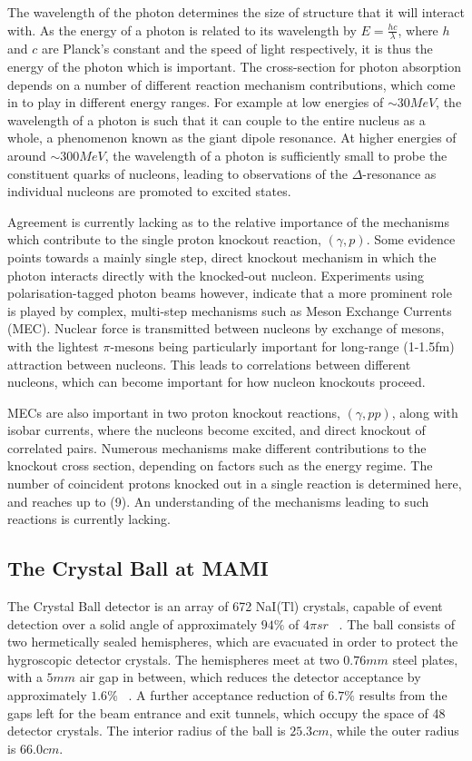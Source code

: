 \documentclass[a4paper,12pt]{article}
\begin{document}
The wavelength of the photon determines the size of structure that it will interact with. As the energy of a photon is related to its wavelength by $E=\frac{hc}{\lambda}$, where $h$ and $c$ are Planck's constant and the speed of light respectively, it is thus the energy of the photon which is important. The cross-section for photon absorption depends on a number of different reaction mechanism contributions, which come in to play in different energy ranges. For example at low energies of $\sim30MeV$, the wavelength of a photon is such that it can couple to the entire nucleus as a whole, a phenomenon known as the giant dipole resonance. At higher energies of around $\sim300MeV$, the wavelength of a photon is sufficiently small to probe the constituent quarks of nucleons, leading to observations of the $\Delta$-resonance as individual nucleons are promoted to excited states.

Agreement is currently lacking as to the relative importance of the mechanisms which contribute to the single proton knockout reaction, $(\gamma,p)$\cite{meucci}{}. Some evidence points towards a mainly single step, direct knockout mechanism in which the photon interacts directly with the knocked-out nucleon\cite{boffi}{}. Experiments using polarisation-tagged photon beams however, indicate that a more prominent role is played by complex, multi-step mechanisms such as Meson Exchange Currents (MEC)\cite{bobeldijk}{}. Nuclear force is transmitted between nucleons by exchange of mesons, with the lightest $\pi$-mesons being particularly important for long-range (1-1.5fm) attraction between nucleons.
This leads to correlations between different nucleons, which can become important for how nucleon knockouts proceed.

MECs are also important in two proton knockout reactions, $(\gamma,pp)$, along with isobar currents, where the nucleons become excited, and direct knockout of correlated pairs. Numerous mechanisms make different contributions to the knockout cross section, depending on factors such as the energy regime\cite{robinson}{}. The number of coincident protons knocked out in a single reaction is determined here, and reaches up to (9). An understanding of the mechanisms leading to such reactions is currently lacking.

\subsection{The Crystal Ball at MAMI}
The Crystal Ball detector is an array of 672 NaI(Tl) crystals, capable of event detection over a solid angle of approximately $94\%$ of $4\pi sr$ ~\cite{tarbert}{}. The ball consists of two hermetically sealed hemispheres, which are evacuated in order to protect the hygroscopic detector crystals. The hemispheres meet at two $0.76mm$ steel plates, with a $5mm$ air gap in between, which reduces the detector acceptance by approximately $1.6\%$ ~\cite{starostin}{}. A further acceptance reduction of $6.7\%$ results from the gaps left for the beam entrance and exit tunnels, which occupy the space of 48 detector crystals. The interior radius of the ball is $25.3cm$, while the outer radius is $66.0cm$.
\end{document}
